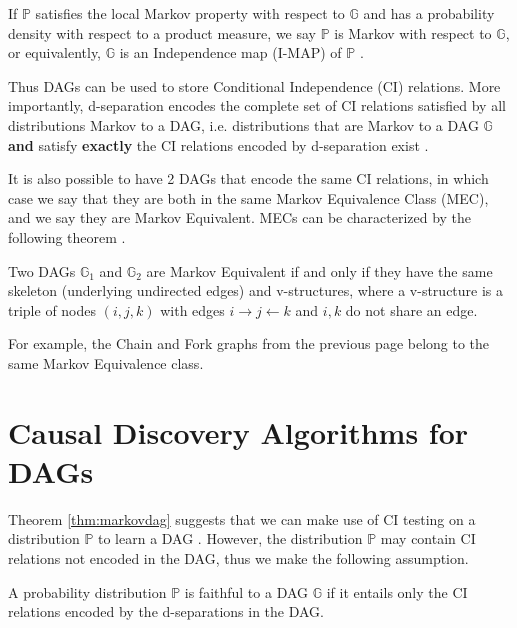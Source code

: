 \documentclass{tufte-book}
\begin{document}
\begin{Definition}
\begin{theorem}
\end{theorem}


If \(\mathbb{P}\) satisfies the local Markov property with respect to \(\mathbb{G}\) and has a probability density with respect to a product measure, we say \(\mathbb{P}\) is Markov with respect to \(\mathbb{G}\), or equivalently, \(\mathbb{G}\) is an Independence map (I-MAP) of \(\mathbb{P}\) \cite{lauritzen-1996-graph}.

Thus DAGs can be used to store Conditional Independence (CI) relations. More importantly, d-separation encodes the complete set of CI relations satisfied by all distributions Markov to a DAG, i.e. distributions that are Markov to a DAG \(\mathbb{G}\) \textbf{and} satisfy \textbf{exactly} the CI relations encoded by d-separation exist \cite{meek-2013-stron-compl,geiger1990identifying}.

It is also possible to have 2 DAGs that encode the same CI relations, in which case we say that they are both in the same Markov Equivalence Class (MEC), and we say they are Markov Equivalent. MECs can be characterized by the following theorem \cite{verma-2013-equiv-causal-model}.

\begin{theorem}\label{thm:vermapearl}
Two DAGs $\mathbb{G}_1$ and $\mathbb{G}_2$ are Markov Equivalent if and only if they have the same skeleton (underlying undirected edges) and v-structures, where a v-structure is a triple of nodes $(i,j,k)$ with edges $i \rightarrow j \leftarrow k$ and $i,k$ do not share an edge.
\end{theorem}

For example, the Chain and Fork graphs from the previous page belong to the same Markov Equivalence class.

\section{Causal Discovery Algorithms for DAGs}
\label{sec:org007656e}

Theorem \ref{thm:markovdag} suggests that we can make use of CI testing on a distribution \(\mathbb{P}\) to learn a DAG . However, the distribution \(\mathbb{P}\) may contain CI relations not encoded in the DAG, thus we make the following assumption.

\begin{definition}[Faithfulness]\label{def:faithfulness}

A probability distribution $\mathbb{P}$ is faithful to a DAG $\mathbb{G}$ if it entails only the CI relations encoded by the d-separations in the DAG.


\end{definition}
\end{Definition}
\end{document}
